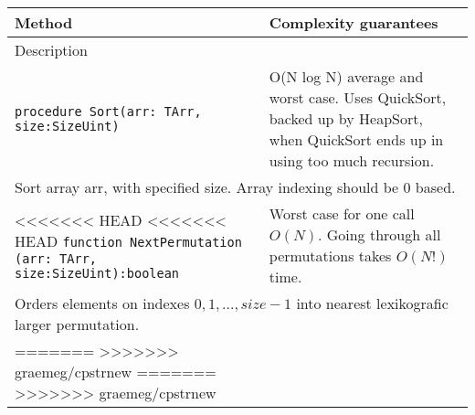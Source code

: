 \begin{longtable}{|m{10cm}|m{5cm}|}
\hline
Method & Complexity guarantees \\ \hline
\multicolumn{2}{|m{15cm}|}{Description} \\ \hline\hline

\verb!procedure Sort(arr: TArr, size:SizeUint)! &
O(N log N) average and worst case. Uses QuickSort, backed up by HeapSort, when QuickSort ends up in
using too much recursion.\\ \hline
\multicolumn{2}{|m{15cm}|}{Sort array arr, with specified size. Array indexing should be 0 based.} \\\hline\hline

<<<<<<< HEAD
<<<<<<< HEAD
\verb!function NextPermutation! \verb!(arr: TArr, size:SizeUint):boolean! &
Worst case for one call $O(N)$. Going through all permutations takes $O(N!)$ time.\\ \hline
\multicolumn{2}{|m{15cm}|}{Orders elements on indexes $0, 1, \dots, size-1$ into nearest
lexikografic larger permutation.} \\\hline


=======
>>>>>>> graemeg/cpstrnew
=======
>>>>>>> graemeg/cpstrnew
\end{longtable}
